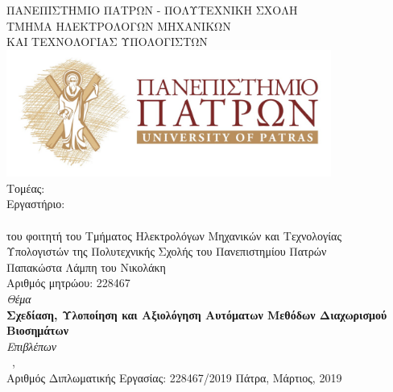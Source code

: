 \begin{titlepage}
\begin{center}
{\large ΠΑΝΕΠΙΣΤΗΜΙΟ ΠΑΤΡΩΝ - ΠΟΛΥΤΕΧΝΙΚΗ ΣΧΟΛΗ}\\
\large ΤΜΗΜΑ ΗΛΕΚΤΡΟΛΟΓΩΝ ΜΗΧΑΝΙΚΩΝ\\ΚΑΙ ΤΕΧΝΟΛΟΓΙΑΣ ΥΠΟΛΟΓΙΣΤΩΝ\\
\hfill \break
\includegraphics[width= 0.8\textwidth]{misc/up_landscape.jpg}\\
\hfill \break
{\Large Τομέας: \division \\
Εργαστήριο: \lab }\\[1cm]

{\emph{\Large{\shortdoctitle }}}\\ [0.5cm]
του φοιτητή του Τμήματος Ηλεκτρολόγων Μηχανικών και Τεχνολογίας\\
Υπολογιστών της Πολυτεχνικής Σχολής  του Πανεπιστημίου Πατρών\\[1cm]

{\Large Παπακώστα Λάμπη του Νικολάκη}\\[0.5cm]
{\large Αριθμός μητρώου: 228467}\\[1cm]

\emph{\large Θέμα}\\[0.5cm]
\textbf{\large Σχεδίαση, Υλοποίηση και Αξιολόγηση Αυτόματων Μεθόδων Διαχωρισμού Βιοσημάτων }\\[1cm]
\emph{\large Επιβλέπων}\\[0.5cm]
\large \suptitle \, \supname, \supuni \\[1cm]
\large{Αριθμός Διπλωματικής Εργασίας: 228467/2019 }\hspace{3cm}
\vfill
\large{Πάτρα, Μάρτιος, 2019 }
\end{center}
\end{titlepage}
